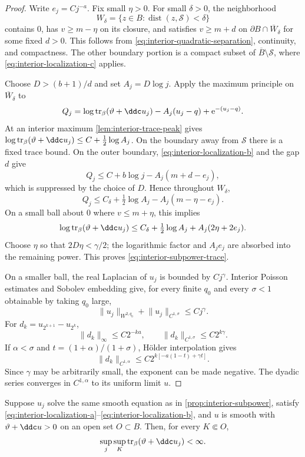 \begin{proof}
Write $e_j=Cj^{-a}$. Fix small $\eta>0$. For small $\delta>0$, the neighborhood
\[
  W_\delta=\{z\in B:\operatorname{dist}(z,\mathcal S)<\delta\}
\]
contains $0$, has $v\geq m-\eta$ on its closure, and satisfies $v\geq m+d$ on $\partial B\cap\overline W_\delta$ for some fixed $d>0$. This follows from \eqref{eq:interior-quadratic-separation}, continuity, and compactness. The other boundary portion is a compact subset of $\overline B\setminus\mathcal S$, where \eqref{eq:interior-localization-c} applies.

Choose $D>(b+1)/d$ and set $A_j=D\log j$. Apply the maximum principle on $\overline W_\delta$ to
\[
  Q_j=\log\operatorname{tr}_\beta(\vartheta+\ddc u_j)-A_j(u_j-q)+\mathrm{e}^{-(u_j-q)}.
\]
At an interior maximum \cref{lem:interior-trace-peak} gives $\log\operatorname{tr}_\beta(\vartheta+\ddc u_j)\leq C+\frac12\log A_j$. On the boundary away from $\mathcal S$ there is a fixed trace bound. On the outer boundary, \eqref{eq:interior-localization-b} and the gap $d$ give
\[
  Q_j\leq C+b\log j-A_j(m+d-e_j),
\]
which is suppressed by the choice of $D$. Hence throughout $W_\delta$,
\[
  Q_j\leq C_\delta+\tfrac12\log A_j-A_j(m-\eta-e_j).
\]
On a small ball about $0$ where $v\leq m+\eta$, this implies
\[
  \log\operatorname{tr}_\beta(\vartheta+\ddc u_j)
  \leq C_\delta+\tfrac12\log A_j+A_j(2\eta+2e_j).
\]
Choose $\eta$ so that $2D\eta<\gamma/2$; the logarithmic factor and $A_je_j$ are absorbed into the remaining power. This proves \eqref{eq:interior-subpower-trace}.

On a smaller ball, the real Laplacian of $u_j$ is bounded by $Cj^\gamma$. Interior Poisson estimates and Sobolev embedding give, for every finite $q_0$ and every $\sigma<1$ obtainable by taking $q_0$ large,
\[
  \lVert u_j\rVert_{W^{2,q_0}}+\lVert u_j\rVert_{C^{1,\sigma}}
  \leq Cj^\gamma.
\]
For $d_k=u_{2^{k+1}}-u_{2^k}$,
\[
  \lVert d_k\rVert_\infty\leq C2^{-ka},
  \qquad
  \lVert d_k\rVert_{C^{1,\sigma}}\leq C2^{k\gamma}.
\]
If $\alpha<\sigma$ and $t=(1+\alpha)/(1+\sigma)$, H\"older interpolation gives
\[
  \lVert d_k\rVert_{C^{1,\alpha}}
  \leq C2^{k[-a(1-t)+\gamma t]}.
\]
Since $\gamma$ may be arbitrarily small, the exponent can be made negative. The dyadic series converges in $C^{1,\alpha}$ to its uniform limit $u$.
\end{proof}

\begin{proposition}\label{prop:interior-regular-stability}
Suppose $u_j$ solve the same smooth equation as in \cref{prop:interior-subpower}, satisfy \eqref{eq:interior-localization-a}--\eqref{eq:interior-localization-b}, and $u$ is smooth with $\vartheta+\ddc u>0$ on an open set $O\subset B$. Then, for every $K\Subset O$,
\begin{equation}\label{eq:interior-regular-stability}
  \sup_j\sup_K\operatorname{tr}_\beta(\vartheta+\ddc u_j)<\infty.
\end{equation}
\end{proposition}

